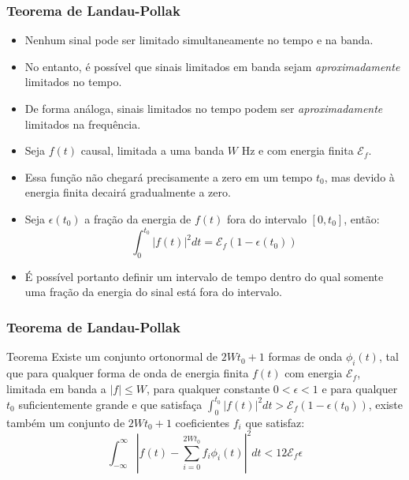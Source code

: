 \begin{frame}
	\frametitle{Teorema de Landau-Pollak}

	\begin{itemize}	   
	    \item Nenhum sinal pode ser limitado simultaneamente no tempo e na banda.
	    \item No entanto, é possível que sinais limitados em banda sejam \textit{aproximadamente} limitados no tempo. 
	    \item De forma análoga, sinais limitados no tempo podem ser \textit{aproximadamente} limitados na frequência. 
	    \item Seja $f(t)$ causal, limitada a uma banda $W$ Hz e com energia finita $\mathcal{E}_f$.
	    \item Essa função não chegará precisamente a zero em um tempo $t_0$, mas devido à energia finita decairá gradualmente a zero.
 	    \item Seja $\epsilon(t_0)$ a fração da energia de $f(t)$ fora do intervalo $[0,t_0]$, então:
 	    \begin{equation*}
		\int_0^{t_0} |f(t)|^2 dt = \mathcal{E}_f (1-\epsilon(t_0))
 	    \end{equation*}
	    \item É possível portanto definir um intervalo de tempo dentro do qual somente uma fração da energia do sinal está fora do intervalo.
	\end{itemize}	 
\end{frame}

\begin{frame}
	\frametitle{Teorema de Landau-Pollak}

	\begin{block}{Teorema}
	    Existe um conjunto ortonormal de $2Wt_0+1$ formas de onda $\phi_i(t)$, tal que para qualquer forma de onda de energia finita $f(t)$ com energia $\mathcal{E}_f$, limitada em banda a $|f| \leq W$, para qualquer constante $0 < \epsilon < 1$ e para qualquer $t_0$ suficientemente grande e que satisfaça $\int_0^{t_0} |f(t)|^2 dt > \mathcal{E}_f (1-\epsilon(t_0))$, existe também um conjunto de $2Wt_0+1$ coeficientes $f_i$ que satisfaz:
	    \begin{equation*}
		\int_{-\infty}^{\infty} \left| f(t) - \sum_{i=0}^{2Wt_0} f_i \phi_i(t) \right|^2 dt < 12\mathcal{E}_f \epsilon
	    \end{equation*}
	\end{block}
\end{frame}


